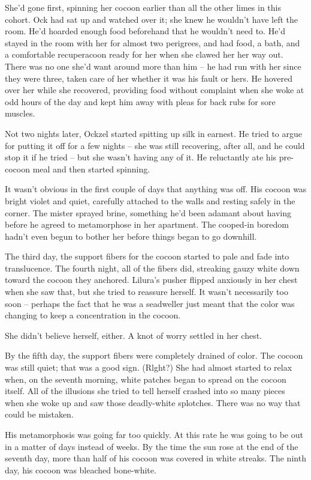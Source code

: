 \documentclass[a1paper]{article}
\begin{document}
\begin{multicols}{7}
{She'd gone first, spinning her cocoon earlier than all the other limes in this cohort.  Ock had sat up and watched over it; she knew he wouldn't have left the room.  He'd hoarded enough food beforehand that he wouldn't need to.  He'd stayed in the room with her for almost two perigrees, and had food, a bath, and a comfortable recuperacoon ready for her when she clawed her her way out.  There was no one she'd want around more than him – he had run with her since they were three, taken care of her whether it was his fault or hers.  He hovered over her while she recovered, providing food without complaint when she woke at odd hours of the day and kept him away with pleas for back rubs for sore muscles.

Not two nights later, Ockzel started spitting up silk in earnest.  He tried to argue for putting it off for a few nights – she was still recovering, after all, and he could stop it if he tried – but she wasn't having any of it.  He reluctantly ate his pre-cocoon meal and then started spinning.

It wasn't obvious in the first couple of days that anything was off.  His cocoon was bright violet and quiet, carefully attached to the walls and resting safely in the corner.  The mister sprayed brine, something he'd been adamant about having before he agreed to metamorphose in her apartment.  The cooped-in boredom hadn't even begun to bother her before things began to go downhill.

The third day, the support fibers for the cocoon started to pale and fade into translucence.  The fourth night, all of the fibers did, streaking gauzy white down toward the cocoon they anchored.  Lilura's pusher flipped anxiously in her chest when she saw that, but she tried to reassure herself.  It wasn't necessarily too soon – perhaps the fact that he was a seadweller just meant that the color was changing to keep a concentration in the cocoon.

She didn't believe herself, either.  A knot of worry settled in her chest.

By the fifth day, the support fibers were completely drained of color.  The cocoon was still quiet; that was a good sign.  (Rlght?)  She had almost started to relax when, on the seventh morning, white patches began to spread on the cocoon itself.  All of the illusions she tried to tell herself crashed into so many pieces when she woke up and saw those deadly-white splotches.  There was no way that could be mistaken.

His metamorphosis was going far too quickly.  At this rate he was going to be out in a matter of days instead of weeks.  By the time the sun rose at the end of the seventh day, more than half of his cocoon was covered in white streaks.  The ninth day, his cocoon was bleached bone-white.

}
\end{multicols}
\end{document}
